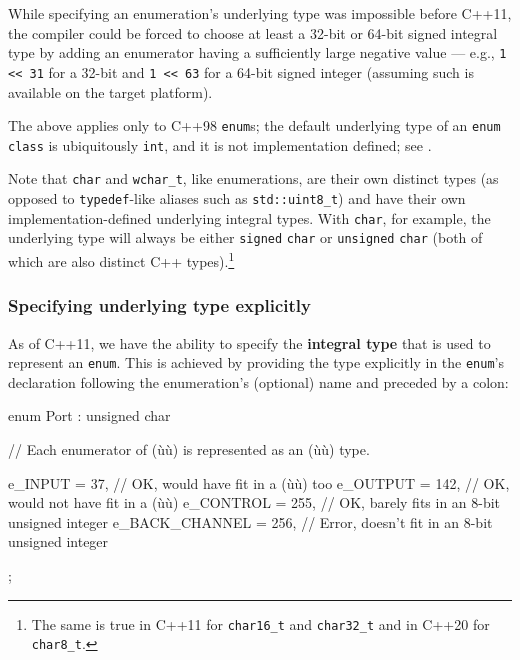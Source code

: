 While specifying an enumeration’s underlying type was impossible before C++11, the compiler could be forced to choose at least a 32-bit or 64-bit signed integral type by adding an enumerator having a sufficiently large negative value --- e.g., \lstinline!1 << 31! for a 32-bit and \lstinline!1 << 63! for a 64-bit signed integer (assuming such is available on the target platform).

The above applies only to C++98 \lstinline!enum!s; the default underlying type of an \lstinline!enum! \lstinline!class! is ubiquitously \lstinline!int!, and it is not implementation defined; see .

Note that \lstinline!char! and \lstinline!wchar_t!, like enumerations, are their own distinct types (as opposed to \lstinline!typedef!-like aliases such as \lstinline!std::uint8_t!) and have their own implementation-defined underlying integral types. With \lstinline!char!, for example, the underlying type will always be either \lstinline!signed! \lstinline!char! or \lstinline!unsigned! \lstinline!char! (both of which are also distinct C++ types).{\cprotect\footnote{The same is true in C++11 for
\texttt{char16\_t} and \texttt{char32\_t} and in C++20 for
  \texttt{char8\_t}.}}

\subsubsection[Specifying underlying type explicitly]{Specifying underlying type explicitly}\label{specifying-underlying-type-explicitly}

As of C++11, we have the ability to specify the \textbf{integral type}
that is used to represent an \texttt{enum}. This is achieved by
providing the type explicitly in the \texttt{enum}'s declaration
following the enumeration's (optional) name and preceded by a colon:

\begin{emcppslisting}
enum Port : unsigned char
{
    // Each enumerator of (ù{}ù) is represented as an (ù{}ù) type.

    e_INPUT        =  37,  // OK, would have fit in a (ù{}ù) too
    e_OUTPUT       = 142,  // OK, would not have fit in a (ù{}ù)
    e_CONTROL      = 255,  // OK, barely fits in an 8-bit unsigned integer
    e_BACK_CHANNEL = 256,  // Error, doesn't fit in an 8-bit unsigned integer
};
\end{emcppslisting}


